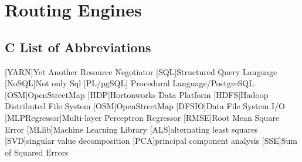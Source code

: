 \documentclass[12pt]{report}
\renewcommand{\listfigurename}{\begingroup
    \tocchapter{}
    \tocfile{\listoffigurename}{B Illustration Directory}
\endgroup}
\begin{document}
\chapter{Routing Engines}


\newpage


\renewcommand{\listfigurename}{B Illustration Directory}
\listoffigures
\section*{C List of Abbreviations}
\begin{acronym}
    [YARN]{Yet Another Resource Negotiator}
     [SQL]{Structured Query Language}
     [NoSQL]{Not only Sql}
    [PL/pgSQL] {Procedural Language/PostgreSQL}
    [OSM]{OpenStreetMap}
    [HDP]{Hortonworks Data Platform}
     [HDFS]{Hadoop Distributed File System}
    [OSM]{OpenStreetMap}
    [DFSIO]{Data File System I/O}
    [MLPRegressor]{Multi-layer Perceptron Regressor}
    [RMSE]{Root Mean Square Error}
    [MLlib]{Machine Learning Library}
    [ALS]{alternating least squares}
    [SVD]{singular value decomposition}
    [PCA]{principal component analysis}
    [SSE]{Sum of Squared Errors}
\end{acronym}
\end{document}
